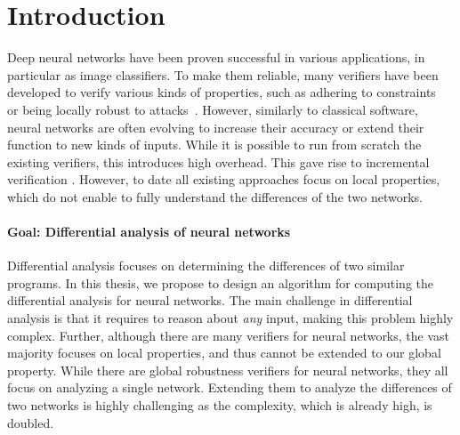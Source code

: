 
\section{Introduction}
Deep neural networks have been proven successful in various applications, in particular as image classifiers.
To make them reliable, many verifiers have been developed to verify various kinds of properties, such as adhering to constraints~\cite{Reluplex} or being locally robust to attacks~\cite{Reluplex,ABSTRACTINTER}. 
However, similarly to classical software, neural networks are often evolving to increase their accuracy or extend their function to new kinds of inputs. 
While it is possible to run from scratch the existing verifiers, this introduces high overhead.
This gave rise to incremental verification .  
However, to date all existing approaches focus on local properties, which do not enable to fully understand the differences of the two networks.

\paragraph{Goal: Differential analysis of neural networks}
Differential analysis focuses on determining the differences of two similar programs. 
In this thesis, we propose to design an algorithm for computing the differential analysis for neural networks.
The main challenge in differential analysis is that it requires to reason about \emph{any} input, 
making this problem highly complex. Further, although there are many verifiers for neural networks, the vast majority focuses on local properties, and thus cannot be extended to our global property.
While there are global robustness verifiers for neural networks, they all focus on analyzing a single network. 
Extending them to analyze the differences of two networks is highly challenging as the complexity, which is already high, is doubled.

